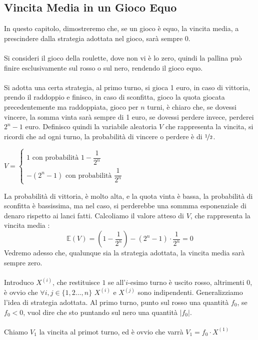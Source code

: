 \documentclass[12pt, letterpaper]{article}
\newcommand{\E}{{\mathbb E}}
\newcommand{\acc}{\\\hphantom{}\\}
\begin{document}
\subsection{Vincita Media in un Gioco Equo}
In questo capitolo, dimostreremo che, se un gioco è equo, la vincita media, a prescindere dalla strategia 
adottata nel gioco, sarà sempre 0.\acc 
Si consideri il gioco della roulette, dove non vi è lo zero, quindi la pallina può finire esclusivamente sul 
rosso o sul nero, rendendo il gioco equo. \acc 
Si adotta una certa strategia, al primo turno, si gioca 1 euro, in caso di vittoria, prendo il raddoppio e finisco, 
in caso di sconfitta, gioco la quota giocata precedentemente ma raddoppiata, gioco per \(n\) turni, è chiaro che, 
se dovessi vincere, la somma vinta sarà sempre di 1 euro, se dovessi perdere invece, perderei 
\(2^n-1\) euro. Definisco quindi la variabile aleatoria \(V\) che rappresenta la vincita, si ricordi che ad 
ogni turno, la probabilità di vincere o perdere è di \(\nicefrac{1}{2}\).\begin{center}
    \(V=\begin{cases}
        1 \text{ con probabilità } 1-\dfrac{1}{2^n}\\
        -(2^n-1) \text{ con probabilità } \dfrac{1}{2^n}
    \end{cases}\)
\end{center}
La probabilità di vittoria, è molto alta, e la quota vinta è bassa, la probabilità di sconfitta è bassissima, 
ma nel caso, si perderebbe una sommma esponenziale di denaro rispetto ai lanci fatti. Calcoliamo il 
valore atteso di \(V\), che rappresenta la vincita media : \begin{equation}
    \E(V)=(1-\dfrac{1}{2^n})-(2^n-1)\cdot\dfrac{1}{2^n}=0
\end{equation}
Vedremo adesso che, qualunque sia la strategia adottata, la vincita media sarà sempre zero.\acc 
Introduco \(X^{(i)}\), che restituisce \(1\) se all'\(i\)-esimo turno è uscito rosso, altrimenti 0, è ovvio che 
\(\forall i,j\in\{1,2\dots,n\}\) \(X^{(i)}\) e \(X^{(j)}\) sono indipendenti. Generalizziamo l'idea di 
strategia adottata. Al primo turno, punto sul rosso una quantità \(f_0\), se \(f_0<0\), vuol 
dire che sto puntando sul nero una quantità \(|f_0|\). \acc Chiamo \(V_1\) la vincita al primot turno, 
ed è ovvio che varrà \(V_1=f_0\cdot X^{(1)}\)\acc
\end{document}
